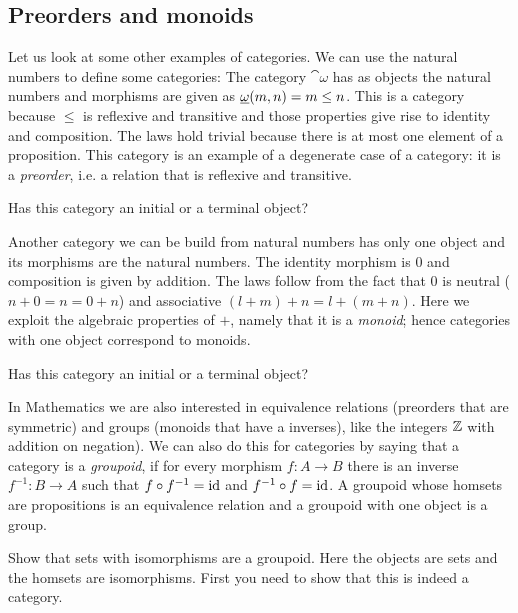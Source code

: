 \subsection{Preorders and monoids}
\label{sec:preorders-mnoids}

Let us look at some other examples of categories. We can use the natural numbers to define some categories: The category $\cat{\omega}$ has as objects the natural numbers and morphisms are given as $\underline{\mathbf{\omega}}(m,n) = m \leq n$. This is a category because $\leq$ is reflexive and transitive and those properties give rise to identity and composition. The laws hold trivial because there is at most one element of a proposition. This category is an example of a degenerate case of a category: it is a \emph{preorder}, i.e. a relation that is reflexive and transitive. 

\begin{question}
  Has this category an initial or a terminal object? 
\end{question}


Another category we can be build from natural numbers has only one object and its morphisms are the natural numbers. The identity morphism is $0$ and composition is given by addition. The laws follow from the fact that $0$ is neutral ($n+0 = n = 0+n$) and associative $(l+m)+n = l+(m+n)$. Here we exploit the algebraic properties of $+$, namely that it is a \emph{monoid}; hence categories with one object correspond to monoids.

\begin{question}
  Has this category an initial or a terminal object? 
\end{question}

In Mathematics we are also interested in equivalence relations (preorders that are symmetric) and groups (monoids that have a inverses), like the integers $\mathbb{Z}$ with addition on negation). We can also do this for categories by saying that a category is a \emph{groupoid}, if for every morphism $f : A \to B$ there is an inverse $f^{-1} : B \to A$ such that $f \circ f^{-1} = \mathrm{id}$ and $f^{-1} \circ f = \mathrm{id}$. A groupoid whose homsets are propositions is an equivalence relation and a groupoid with one object is a group.

\begin{Exercise}
  Show that  sets with isomorphisms are a groupoid. Here the objects are sets and the homsets are isomorphisms. First you need to show that this is indeed a category.
\end{Exercise}

